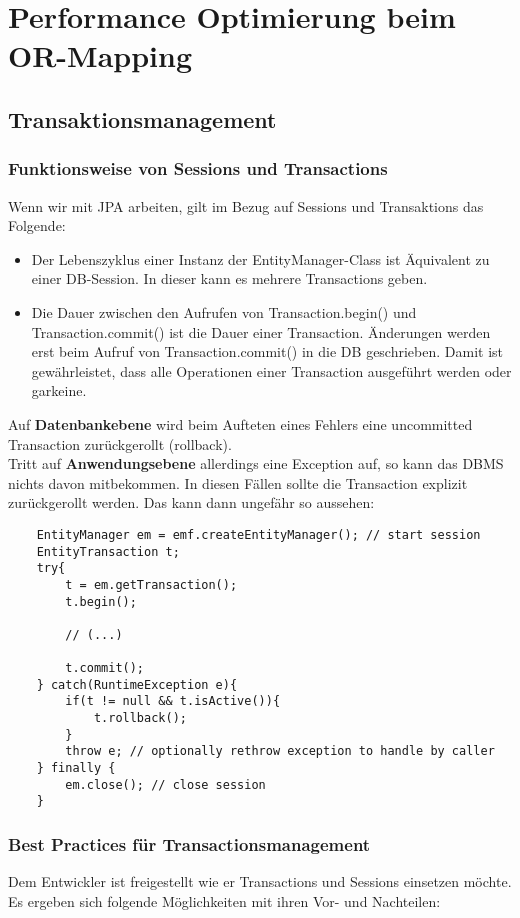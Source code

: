 \section{Performance Optimierung beim OR-Mapping}

\subsection{Transaktionsmanagement}
\subsubsection{Funktionsweise von Sessions und Transactions}

Wenn wir mit JPA arbeiten, gilt im Bezug auf Sessions und Transaktions das Folgende:

\begin{itemize}
    \item Der Lebenszyklus einer Instanz der EntityManager-Class ist Äquivalent zu einer DB-Session. In dieser kann es mehrere Transactions geben.
    \item Die Dauer zwischen den Aufrufen von Transaction.begin() und Transaction.commit() ist die Dauer einer Transaction. Änderungen werden erst beim Aufruf von Transaction.commit() in die DB geschrieben. Damit ist gewährleistet, dass alle Operationen einer Transaction ausgeführt werden oder garkeine.
\end{itemize}

Auf \textbf{Datenbankebene} wird beim Aufteten eines Fehlers eine uncommitted Transaction zurückgerollt (rollback).\\
Tritt auf \textbf{Anwendungsebene} allerdings eine Exception auf, so kann das DBMS nichts davon mitbekommen. In diesen Fällen sollte die Transaction explizit zurückgerollt werden. Das kann dann ungefähr so aussehen:

\begin{lstlisting}
    EntityManager em = emf.createEntityManager(); // start session
    EntityTransaction t;
    try{
        t = em.getTransaction();
        t.begin();

        // (...)

        t.commit();
    } catch(RuntimeException e){
        if(t != null && t.isActive()){
            t.rollback();
        }
        throw e; // optionally rethrow exception to handle by caller
    } finally {
        em.close(); // close session
    }
\end{lstlisting}

\subsubsection{Best Practices für Transactionsmanagement}
Dem Entwickler ist freigestellt wie er Transactions und Sessions einsetzen möchte. Es ergeben sich folgende Möglichkeiten mit ihren Vor- und Nachteilen:

